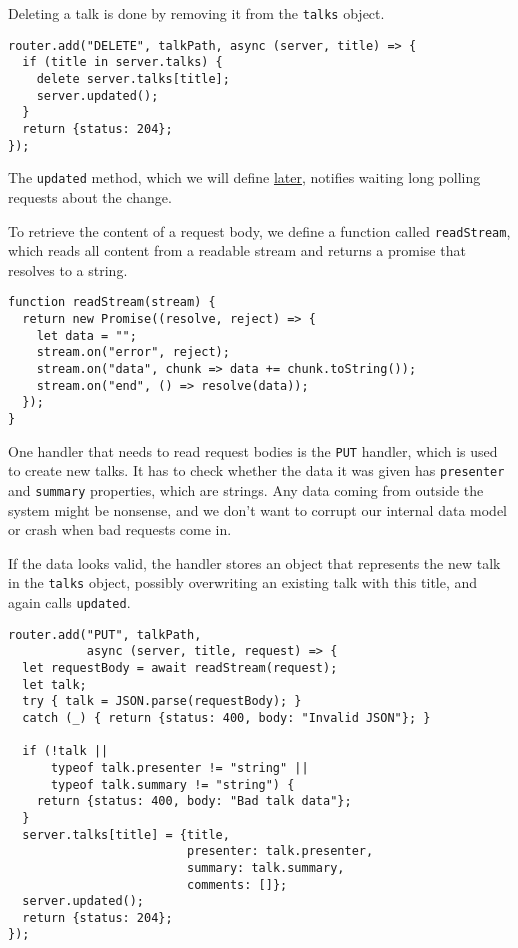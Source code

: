 Deleting a talk is done by removing it from the \lstinline`talks` object.

\begin{lstlisting}
router.add("DELETE", talkPath, async (server, title) => {
  if (title in server.talks) {
    delete server.talks[title];
    server.updated();
  }
  return {status: 204};
});
\end{lstlisting}
\noindent{}

The \lstinline`updated` method, which we will define \hyperref[skillsharing.updated]{later}, notifies waiting long polling requests about the change.

To retrieve the content of a request body, we define a function called \lstinline`readStream`, which reads all content from a readable stream and returns a promise that resolves to a string.

\begin{lstlisting}
function readStream(stream) {
  return new Promise((resolve, reject) => {
    let data = "";
    stream.on("error", reject);
    stream.on("data", chunk => data += chunk.toString());
    stream.on("end", () => resolve(data));
  });
}
\end{lstlisting}
\noindent{}

One handler that needs to read request bodies is the \lstinline`PUT` handler, which is used to create new talks. It has to check whether the data it was given has \lstinline`presenter` and \lstinline`summary` properties, which are strings. Any data coming from outside the system might be nonsense, and we don't want to corrupt our internal data model or crash when bad requests come in.

If the data looks valid, the handler stores an object that represents the new talk in the \lstinline`talks` object, possibly overwriting an existing talk with this title, and again calls \lstinline`updated`.

\begin{lstlisting}
router.add("PUT", talkPath,
           async (server, title, request) => {
  let requestBody = await readStream(request);
  let talk;
  try { talk = JSON.parse(requestBody); }
  catch (_) { return {status: 400, body: "Invalid JSON"}; }

  if (!talk ||
      typeof talk.presenter != "string" ||
      typeof talk.summary != "string") {
    return {status: 400, body: "Bad talk data"};
  }
  server.talks[title] = {title,
                         presenter: talk.presenter,
                         summary: talk.summary,
                         comments: []};
  server.updated();
  return {status: 204};
});
\end{lstlisting}
\noindent{}

